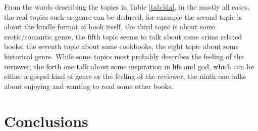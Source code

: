 \documentclass[fleqn,10pt]{SelfArx}
\begin{document}
From the words describing the topics in Table \ref{tab:lda}, in the mostly all cases, the real topics such as genre can be deduced, for example the second topic is about the kindle format of book itself, the third topic is about some erotic/romantic genre, the fifth topic seems to talk about some crime related books, the seventh topic about some cookbooks, the eight topic about some historical genre.
While some topics most probably describes the feeling of the reviewer, the forth one talk about some inspiration in life and god, which can be either a gospel kind of genre or the feeling of the reviewer, the ninth one talks about enjoying and wanting to read some other books.




\newpage
\part*{Conclusions}

\newpage
\nocite{*}
\printbibliography


\end{document}
